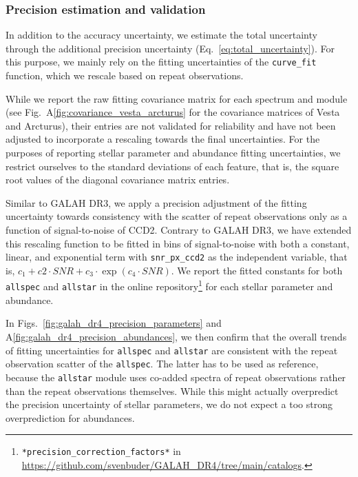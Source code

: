 \documentclass[
  journal=pasa,
  manuscript=research-paper, %
  year=2024,
  volume=37
]{cup-journal}
\begin{document}
\subsubsection{Precision estimation and validation} \label{sec:uncertainty_precision}

In addition to the accuracy uncertainty, we estimate the total uncertainty through the additional precision uncertainty (Eq.~\ref{eq:total_uncertainty}). For this purpose, we mainly rely on the fitting uncertainties of the \texttt{curve\_fit} function, which we rescale based on repeat observations.

While we report the raw fitting covariance matrix for each spectrum and module (see Fig.~A\ref{fig:covariance_vesta_arcturus} for the covariance matrices of Vesta and Arcturus), their entries are not validated for reliability and have not been adjusted to incorporate a rescaling towards the final uncertainties. For the purposes of reporting stellar parameter and abundance fitting uncertainties, we restrict ourselves to the standard deviations of each feature, that is, the square root values of the diagonal covariance matrix entries.

Similar to GALAH DR3, we apply a precision adjustment of the fitting uncertainty towards consistency with the scatter of repeat observations only as a function of signal-to-noise of CCD2. Contrary to GALAH DR3, we have extended this rescaling function to be fitted in bins of signal-to-noise with both a constant, linear, and exponential term with \texttt{snr\_px\_ccd2} as the independent variable, that is, $c_1 + c2 \cdot SNR + c_3 \cdot \exp(c_4 \cdot SNR)$. We report the fitted constants for both \texttt{allspec} and \texttt{allstar} in the online repository\footnote{\texttt{*precision\_correction\_factors*} in \url{https://github.com/svenbuder/GALAH_DR4/tree/main/catalogs}.} for each stellar parameter and abundance. 

In Figs.~\ref{fig:galah_dr4_precision_parameters} and A\ref{fig:galah_dr4_precision_abundances}, we then confirm that the overall trends of fitting uncertainties for \texttt{allspec} and \texttt{allstar} are consistent with the repeat observation scatter of the \texttt{allspec}. The latter has to be used as reference, because the \texttt{allstar} module uses co-added spectra of repeat observations rather than the repeat observations themselves. While this might actually overpredict the precision uncertainty of stellar parameters, we do not expect a too strong overprediction for abundances.
\end{document}

